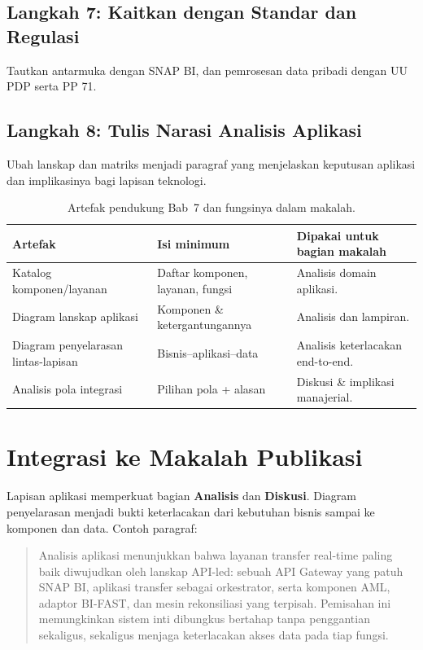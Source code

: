 \subsection{Langkah 7: Kaitkan dengan Standar dan Regulasi}
Tautkan antarmuka dengan SNAP BI, dan pemrosesan data pribadi dengan UU PDP serta
PP 71.

\subsection{Langkah 8: Tulis Narasi Analisis Aplikasi}
Ubah lanskap dan matriks menjadi paragraf yang menjelaskan keputusan aplikasi dan
implikasinya bagi lapisan teknologi.

\begin{table}[htbp]
\centering
\scriptsize
\caption{Artefak pendukung Bab~7 dan fungsinya dalam makalah.}
\label{tab:artefak-bab6-app}
\begin{tabularx}{\textwidth}{@{}p{} p{} X@{}}
\hline
\textbf{Artefak} & \textbf{Isi minimum} & \textbf{Dipakai untuk bagian makalah} \\
\hline
Katalog komponen/layanan & Daftar komponen, layanan, fungsi & Analisis domain
aplikasi. \\
Diagram lanskap aplikasi & Komponen \& ketergantungannya & Analisis dan lampiran. \\
Diagram penyelarasan lintas-lapisan & Bisnis--aplikasi--data & Analisis
keterlacakan end-to-end. \\
Analisis pola integrasi & Pilihan pola + alasan & Diskusi \& implikasi
manajerial. \\
\hline
\end{tabularx}
\end{table}

\section{Integrasi ke Makalah Publikasi}

Lapisan aplikasi memperkuat bagian \textbf{Analisis} dan \textbf{Diskusi}.
Diagram penyelarasan menjadi bukti keterlacakan dari kebutuhan bisnis sampai ke
komponen dan data. Contoh paragraf:

\begin{quote}
Analisis aplikasi menunjukkan bahwa layanan transfer real-time paling baik
diwujudkan oleh lanskap API-led: sebuah API Gateway yang patuh SNAP BI, aplikasi
transfer sebagai orkestrator, serta komponen AML, adaptor BI-FAST, dan mesin
rekonsiliasi yang terpisah. Pemisahan ini memungkinkan sistem inti dibungkus
bertahap tanpa penggantian sekaligus, sekaligus menjaga keterlacakan akses data
pada tiap fungsi.
\end{quote}

